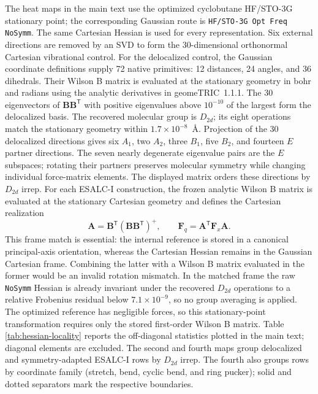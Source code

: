 \documentclass[10pt]{article}
\newcommand{\Bmat}{\mathbf{B}}
\begin{document}
{The heat maps in the main text use the optimized cyclobutane HF/STO-3G
stationary point; the
corresponding Gaussian route is \texttt{HF/STO-3G Opt Freq NoSymm}.  The same Cartesian
Hessian is used for every representation.  Six external directions are removed by an
SVD to form the 30-dimensional orthonormal Cartesian vibrational control.  For
{the delocalized control, the Gaussian coordinate definitions supply
72 native primitives: 12 distances, 24 angles, and 36 dihedrals.  Their
Wilson B matrix is evaluated at the stationary geometry in bohr and
radians using the analytic derivatives in geomeTRIC~1.1.1.\cite{WangSong2016GeomeTRIC}
The 30 eigenvectors of \(\Bmat\Bmat^{\mathsf T}\) with positive
eigenvalues above \(10^{-10}\) of the largest form the delocalized basis.
{The recovered molecular group is \(D_{2d}\); its eight
operations match the stationary geometry within \(1.7\times10^{-8}\)~\AA.
Projection of
the 30 delocalized directions gives six \(A_1\), two \(A_2\), three \(B_1\),
five \(B_2\), and fourteen \(E\) partner directions.  The seven nearly
degenerate eigenvalue pairs are the \(E\) subspaces; rotating their partners
preserves molecular symmetry while changing individual force-matrix elements.
The displayed matrix orders these directions by \(D_{2d}\) irrep.}}  For
each ESALC-I construction, the frozen analytic {Wilson B matrix} is evaluated at
the stationary Cartesian geometry and defines the
Cartesian realization
\[
 \mathbf A=\Bmat^{\mathsf T}
 (\Bmat\Bmat^{\mathsf T})^+,
 \qquad
\mathbf F_q=\mathbf A^{\mathsf T}\mathbf F_x\mathbf A.
\]
This frame match is essential: the internal reference is stored in a canonical
principal-axis orientation, whereas the Cartesian Hessian remains in the
Gaussian Cartesian frame.  Combining the latter with a {Wilson B matrix} evaluated
in the former would be an invalid rotation mismatch.  In the matched frame the
raw \texttt{NoSymm} Hessian is already invariant under the recovered \(D_{2d}\)
operations to a relative Frobenius residual below \(7.1\times10^{-9}\), so no
group averaging is applied.
The optimized reference has negligible forces, so this stationary-point
transformation requires only the stored first-order {Wilson B matrix}.  Table
\ref{tab:hessian-locality} reports the off-diagonal statistics plotted in the
main text; diagonal elements are excluded.
{The second and fourth maps group delocalized and
symmetry-adapted ESALC-I rows by \(D_{2d}\) irrep.  The fourth also groups
rows by coordinate family (stretch, bend, cyclic bend, and ring pucker);
solid and dotted separators mark the respective boundaries.}

}
\end{document}
